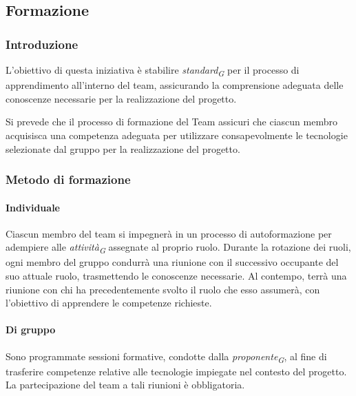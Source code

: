 \subsection{Formazione}
\subsubsection{Introduzione}
L'obiettivo di questa iniziativa è stabilire \textit{standard}\textsubscript{\textit{G}} per il processo di apprendimento all'interno del team, assicurando la comprensione adeguata delle conoscenze necessarie per la realizzazione del progetto.

\vspace*{0.1cm}

Si prevede che il processo di formazione del Team assicuri che ciascun membro acquisisca una competenza adeguata per utilizzare consapevolmente le tecnologie selezionate dal gruppo per la realizzazione del progetto.

\subsubsection{Metodo di formazione}
\paragraph{Individuale}
Ciascun membro del team si impegnerà in un processo di autoformazione per adempiere alle \textit{attività}\textsubscript{\textit{G}} assegnate al proprio ruolo. Durante la rotazione dei ruoli, ogni membro del gruppo condurrà una riunione con il successivo occupante del suo attuale ruolo, trasmettendo le conoscenze necessarie. Al contempo, terrà una riunione con chi ha precedentemente svolto il ruolo che esso assumerà, con l'obiettivo di apprendere le competenze richieste. 

\paragraph{Di gruppo}
Sono programmate sessioni formative, condotte dalla \textit{proponente}\textsubscript{\textit{G}}, al fine di trasferire competenze relative alle tecnologie impiegate nel contesto del progetto. La partecipazione del team a tali riunioni è obbligatoria. 
